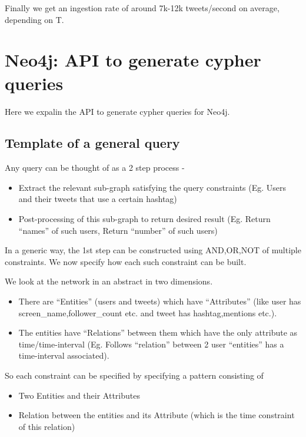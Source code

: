 \documentclass[letterpaper,10pt,english]{sphinxmanual}
\begin{document}
Finally we get an ingestion rate of around 7k-12k tweets/second on average, depending on T.


\chapter{Neo4j: API to generate cypher queries}
\label{\detokenize{neo4j_query_generation:neo4j-api-to-generate-cypher-queries}}\label{\detokenize{neo4j_query_generation::doc}}
Here we expalin the API to generate cypher queries for Neo4j.


\section{Template of a general query}
\label{\detokenize{neo4j_query_generation:template-of-a-general-query}}
Any query can be thought of as a 2 step process -
\begin{itemize}
\item {} 
Extract the relevant sub-graph satisfying the query constraints (Eg. Users and their tweets that use a certain hashtag)

\item {} 
Post-processing of this sub-graph to return desired result (Eg. Return “names” of such users, Return “number” of such users)

\end{itemize}

In a generic way, the 1st step can be constructed using AND,OR,NOT of multiple constraints. We now specify how each such constraint can be built.

We look at the network in an abstract in two dimensions.
\begin{itemize}
\item {} 
There are “Entities” (users and tweets) which have “Attributes” (like user has screen\_name,follower\_count etc. and tweet has hashtag,mentions etc.).

\item {} 
The entities have “Relations” between them which have the only attribute as time/time-interval (Eg. Follows “relation” between 2 user “entities” has a time-interval associated).

\end{itemize}

So each constraint can be specified by specifying a pattern consisting of
\begin{itemize}
\item {} 
Two Entities and their Attributes

\item {} 
Relation between the entities and its Attribute (which is the time constraint of this relation)

\end{itemize}
\end{document}

